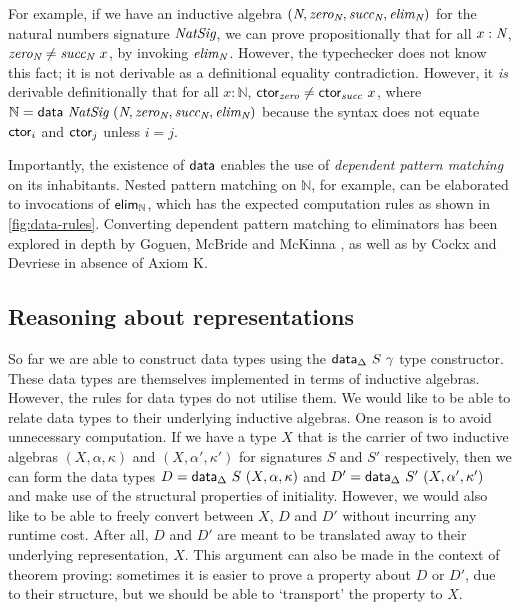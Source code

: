 For example, if we have an inductive algebra $(\textit{N}, \textit{zero}_{\textit{N}},
\textit{succ}_{\textit{N}}, \textit{elim}_{\textit{N}})$ for the natural numbers signature
$\textit{NatSig}$, we can prove propositionally that for all $x : \textit{N}$,
$\textit{zero}_{\textit{N}} \neq \textit{succ}_{\textit{N}}\ x$, by invoking $\textit{elim}_{\textit{N}}$.
However, the typechecker does not know this fact; it is not derivable as a
definitional equality contradiction. However, it \emph{is} derivable
definitionally that for all $x : \mathbb{N}$, $\textsf{ctor}_{\textit{zero}} \neq
\textsf{ctor}_{\textit{succ}}\ x$, where $\mathbb{N} = \textsf{data}\ {\textit{NatSig}}\ (\textit{N},
\textit{zero}_{\textit{N}}, \textit{succ}_{\textit{N}}, \textit{elim}_{\textit{N}})$ because the
syntax does not equate $\textsf{ctor}_i$ and
$\textsf{ctor}_j$ unless $i = j$.

Importantly, the existence of $\textsf{data}$ enables the use of
\emph{dependent pattern matching} on its inhabitants. Nested pattern matching on
$\mathbb{N}$, for example, can be elaborated to invocations of
$\textsf{elim}_{\mathbb{N}}$, which has the expected computation rules as shown in
\cref{fig:data-rules}. Converting dependent pattern matching to eliminators has
been explored in depth by Goguen, McBride and McKinna \cite{Goguen2006-sy}, as
well as by Cockx and Devriese \cite{Cockx2018-bv} in absence of Axiom K.

\subsection{Reasoning about representations} \label{sub:lambdadata}

So far we are able to construct data types using the $\textsf{data}_\Delta\ S\ \gamma$
type constructor. These data types are themselves implemented in terms of
inductive algebras. However, the rules for data types do not utilise them. We
would like to be able to relate data types to their underlying inductive
algebras. One reason is to avoid unnecessary
computation. If we have a type $X$ that is the carrier of two inductive algebras
$(X, \alpha, \kappa)$ and $(X, \alpha', \kappa')$ for signatures $S$ and
$S'$ respectively, then we can form the data types $D = \textsf{data}_\Delta\ S\ (X,
\alpha, \kappa)$ and $D' = \textsf{data}_\Delta\ {S'}\ (X, \alpha', \kappa')$ and make
use of the structural properties of initiality. However, we would also like to
be able to freely convert between $X$, $D$ and $D'$ without incurring any
runtime cost. After all, $D$ and $D'$ are meant to be translated away to their
underlying representation, $X$. This argument can also be made in the context of
theorem proving: sometimes it is easier to prove a property about $D$ or $D'$,
due to their structure, but we should be able to `transport' the property to
$X$.

